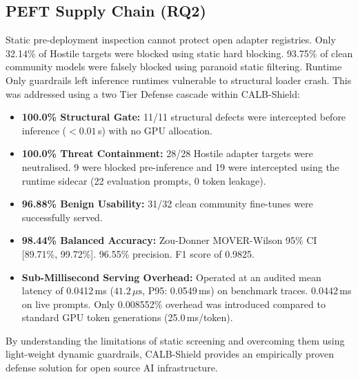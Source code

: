 \subsection{PEFT Supply Chain (RQ2)}
Static pre-deployment inspection cannot protect open adapter registries. Only 32.14\% of Hostile targets were blocked using static hard blocking. 93.75\% of clean community models were falsely blocked using paranoid static filtering. Runtime Only guardrails left inference runtimes vulnerable to structural loader crash. This was addressed using a two Tier Defense cascade within CALB-Shield:
\begin{itemize}
    \item \textbf{100.0\% Structural Gate:} 11/11 structural defects were intercepted before inference ($< 0.01$\,s) with no GPU allocation.
    \item \textbf{100.0\% Threat Containment:} 28/28 Hostile adapter targets were neutralised. 9 were blocked pre-inference and 19 were intercepted using the runtime sidecar (22 evaluation prompts, 0 token leakage).
    \item \textbf{96.88\% Benign Usability:} 31/32 clean community fine-tunes were successfully served.
    \item \textbf{98.44\% Balanced Accuracy:} Zou-Donner MOVER-Wilson 95\% CI [89.71\%, 99.72\%]. 96.55\% precision. F1 score of 0.9825.
    \item \textbf{Sub-Millisecond Serving Overhead:} Operated at an audited mean latency of 0.0412\,ms ($41.2\,\mu\text{s}$, P95: 0.0549\,ms) on benchmark traces. 0.0442\,ms on live prompts. Only 0.008552\% overhead was introduced compared to standard GPU token generations (25.0\,ms/token).
\end{itemize}

By understanding the limitations of static screening and overcoming them using light-weight dynamic guardrails, CALB-Shield provides an empirically proven defense solution for open source AI infrastructure.
